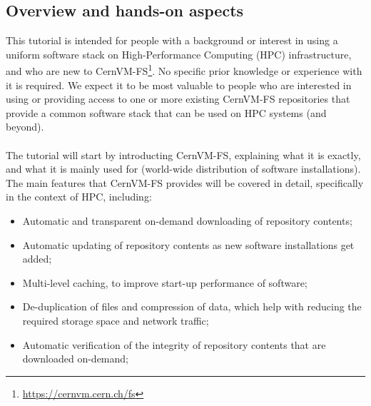 

\subsection*{Overview and hands-on aspects}

This tutorial is intended for people with a background or interest in using a uniform software stack on
High-Performance Computing (HPC) infrastructure, %
and who are new to CernVM-FS\footnote{\href{https://cernvm.cern.ch/fs}{https://cernvm.cern.ch/fs}}.
No specific prior knowledge or experience with it is required.
We expect it to be most valuable to people who are interested in using or providing access to one or more existing
CernVM-FS repositories that provide a common software stack that can be used on HPC systems (and beyond).

\paragraph{} 
The tutorial will start by introducting CernVM-FS, explaining what it is exactly, and what it is mainly used for
(world-wide distribution of software installations). The main features that CernVM-FS provides will be covered in detail,
specifically in the context of HPC, including:
\begin{itemize}
\item Automatic and transparent on-demand downloading of repository contents;
\item Automatic updating of repository contents as new software installations get added;
\item Multi-level caching, to improve start-up performance of software;
\item De-duplication of files and compression of data, which help with reducing the required storage space and network traffic;
\item Automatic verification of the integrity of repository contents that are downloaded on-demand;
\end{itemize}

